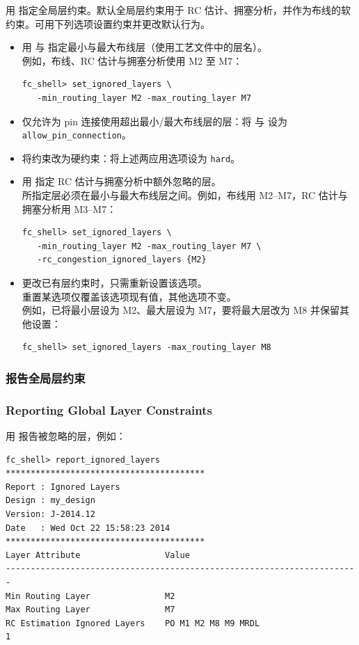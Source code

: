 用  指定全局层约束。默认全局层约束用于 RC 估计、拥塞分析，并作为布线的软约束。可用下列选项设置约束并更改默认行为。
\begin{itemize}
  \item 用  与  指定最小与最大布线层（使用工艺文件中的层名）。\\
        例如，布线、RC 估计与拥塞分析使用 M2 至 M7：
\begin{lstlisting}
fc_shell> set_ignored_layers \
   -min_routing_layer M2 -max_routing_layer M7
\end{lstlisting}
  \item 仅允许为 pin 连接使用超出最小/最大布线层的层：将  与  设为 \texttt{allow\_pin\_connection}。
  \item 将约束改为硬约束：将上述两应用选项设为 \texttt{hard}。
  \item 用  指定 RC 估计与拥塞分析中额外忽略的层。\\
        所指定层必须在最小与最大布线层之间。例如，布线用 M2--M7，RC 估计与拥塞分析用 M3--M7：
\begin{lstlisting}
fc_shell> set_ignored_layers \
   -min_routing_layer M2 -max_routing_layer M7 \
   -rc_congestion_ignored_layers {M2}
\end{lstlisting}
  \item 更改已有层约束时，只需重新设置该选项。\\
        重置某选项仅覆盖该选项现有值，其他选项不变。\\
        例如，已将最小层设为 M2、最大层设为 M7，要将最大层改为 M8 并保留其他设置：
\begin{lstlisting}
fc_shell> set_ignored_layers -max_routing_layer M8
\end{lstlisting}
\end{itemize}

\subsubsection{报告全局层约束}
\subsubsection*{Reporting Global Layer Constraints}

用  报告被忽略的层，例如：
\begin{lstlisting}
fc_shell> report_ignored_layers
****************************************
Report : Ignored Layers
Design : my_design
Version: J-2014.12
Date   : Wed Oct 22 15:58:23 2014
****************************************
Layer Attribute                 Value
-----------------------------------------------------------------------
Min Routing Layer               M2
Max Routing Layer               M7
RC Estimation Ignored Layers    PO M1 M2 M8 M9 MRDL
1
\end{lstlisting}

